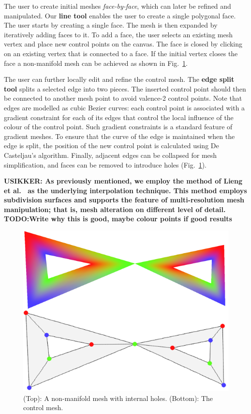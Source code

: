 \documentclass{egpubl}
\newcommand{\note}[3]{{\color{#2}\textbf{#1: #3}}}
\newcommand{\unsure}[1]{\note{USIKKER}{Green}{#1}}
\begin{document}
	The user to create initial meshes \textit{face-by-face}, which can later be refined and manipulated. Our \textbf{line tool} enables the user to create a single polygonal face. The user starts by creating a single face. The mesh is then expanded by iteratively adding faces to it. To add a face, the user selects an existing mesh vertex and place new control points on the canvas. The face is closed by clicking on an existing vertex that is connected to a face. If the initial vertex closes the face a non-manifold mesh can be achieved as shown in Fig.~\ref{fig:nonManifoldHoleMesh}.
	
	The user can further locally edit and refine the control mesh. The \textbf{edge split tool} splits a selected edge into two pieces. The inserted control point should then be connected to another mesh point to avoid valence-2 control points. Note that edges are modelled as cubic Bezier curves: each control point is associated with a gradient constraint for each of its edges that control the local influence of the colour of the control point. Such gradient constraints is a standard feature of gradient meshes. To ensure that the curve of the edge is maintained when the edge is split, the position of the new control point is calculated using De Casteljau's algorithm. Finally, adjacent edges can be collapsed for mesh simplification, and faces can be removed to introduce holes (Fig.~\ref{fig:nonManifoldHoleMesh}).
	
	\unsure{As previously mentioned, we employ the method of Lieng et al.~\cite{Lieng:2016} as the underlying interpolation technique. This method employs subdivision surfaces and supports the feature of multi-resolution mesh manipulation; that is, mesh alteration on different level of detail. TODO:Write why this is good, maybe colour points if good results}
	
	\begin{figure}[t]
		\centering
		\includegraphics[height=0.25\textheight]{HoleAndNonManifoldMesh.png}
		\caption{(Top): A non-manifold mesh with internal holes. (Bottom): The control mesh.}
		\label{fig:nonManifoldHoleMesh}
	\end{figure}
	
\end{document}
